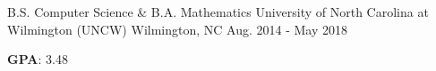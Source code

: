 

\begin{cventries}

  \cventry
    {B.S. Computer Science \& B.A. Mathematics} %
    {University of North Carolina at Wilmington (UNCW)} %
    {Wilmington, NC} %
    {Aug. 2014 - May 2018} %
    {
      \begin{cvitems}
        \item {\textbf{GPA}: 3.48}
      \end{cvitems}
    }
\end{cventries}
